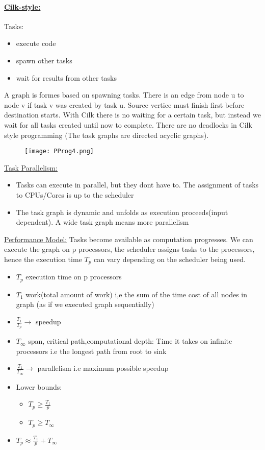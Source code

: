 \documentclass[8pt]{extreport}
\begin{document}
\paragraph{\underline{Cilk-style:}} Tasks:
\begin{itemize}
\item execute code
\item spawn other tasks
\item wait for results from other tasks
\end{itemize}
A graph is formes based on spawning tasks. There is an edge from node u to node v if task v was created by task u. Source vertice must finish first before destination starts.
With Cilk there is no waiting for a certain task, but instead we wait for all tasks created until now to complete. There are no deadlocks in Cilk style programming (The task graphs are directed acyclic graphs).
\begin{figure}[h!]
	\centering\texttt{[image: PProg4.png]}
	\caption{}
	\label{PProg4}
\end{figure}
\newline
\underline{Task Parallelism:}
\begin{itemize}
\item Tasks can execute in parallel, but they dont have to. The assignment of tasks to CPUs/Cores is up to the scheduler
\item The task graph is dynamic and unfolds as execution proceeds(input dependent). A wide task graph means more parallelism
\end{itemize}
\underline{Performance Model:} Tasks become available as computation progresses. We can execute the graph on p processors, the scheduler assigns tasks to the processors, hence the execution time $T_p$ can vary depending on the scheduler being used.
\begin{itemize}
\item $T_p$ execution time on p processors
\item $T_1$ work(total amount of work) i,e the sum of the time cost of all nodes in graph (as if we executed graph sequentially)
\item $\frac{T_1}{T_p} \rightarrow$ speedup
\item $T_\infty$ span, critical path,computational depth: Time it takes on infinite processors i.e the longest path from root to sink
\item $\frac{T_1}{T_\infty} \rightarrow$ parallelism i.e maximum possible speedup
\item Lower bounds:
\begin{itemize}
\item $T_p \geq \frac{T_1}{p}$
\item $T_p \geq T_\infty$
\end{itemize}
\item $T_p \approx \frac{T_1}{p} + T_\infty$
\end{itemize}
\end{document}
